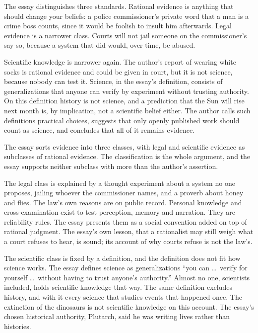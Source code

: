 \begin{afterword}
\summaryhead

The essay distinguishes three standards. Rational evidence is anything that should change your beliefs: a police commissioner's private word that a man is a crime boss counts, since it would be foolish to insult him afterwards. Legal evidence is a narrower class. Courts will not jail someone on the commissioner's say-so, because a system that did would, over time, be abused.

Scientific knowledge is narrower again. The author's report of wearing white socks is rational evidence and could be given in court, but it is not science, because nobody can test it. Science, in the essay's definition, consists of generalizations that anyone can verify by experiment without trusting authority. On this definition history is not science, and a prediction that the Sun will rise next month is, by implication, not a scientific belief either. The author calls such definitions practical choices, suggests that only openly published work should count as science, and concludes that all of it remains evidence.

\responsehead

The essay sorts evidence into three classes, with legal and scientific evidence as subclasses of rational evidence. The classification is the whole argument, and the essay supports neither subclass with more than the author's assertion.

The legal class is explained by a thought experiment about a system no one proposes, jailing whoever the commissioner names, and a proverb about honey and flies. The law's own reasons are on public record. Personal knowledge and cross-examination exist to test perception, memory and narration. They are reliability rules. The essay presents them as a social convention added on top of rational judgment. The essay's own lesson, that a rationalist may still weigh what a court refuses to hear, is sound; its account of why courts refuse is not the law's.

The scientific class is fixed by a definition, and the definition does not fit how science works. The essay defines science as generalizations ``you can \ldots\ verify for yourself \ldots\ without having to trust anyone's authority.'' Almost no one, scientists included, holds scientific knowledge that way. The same definition excludes history, and with it every science that studies events that happened once. The extinction of the dinosaurs is not scientific knowledge on this account. The essay's chosen historical authority, Plutarch, said he was writing lives rather than histories.


\end{afterword}
